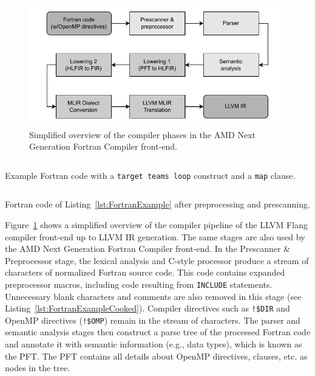 \documentclass[acmtog,natbib=false]{acmart}
\newcommand{\code}[1]{\texttt{#1}\xspace}
\begin{document}
\begin{figure}[t]
\centering
\includegraphics[width=\linewidth]{figures/flang_compiler_phases_overview.pdf}
\caption{Simplified overview of the compiler phases in the AMD Next Generation Fortran Compiler front-end.\label{fig:FlangCompilerPhases}}
\end{figure}

\begin{listing}[t]
\inputminted{Fortran}{code/tgt_loop.f90}
\caption{Example Fortran code with a \code{target teams loop} construct and a \code{map} clause.}
\label{lst:FortranExample}
\end{listing}

\begin{listing}[t]
\inputminted{text}{code/tgt_loop_cooked.f90}
\caption{Fortran code of Listing~\ref{lst:FortranExample} after preprocessing and prescanning.}
\label{lst:FortranExampleCooked}
\end{listing}

Figure~\ref{fig:FlangCompilerPhases} shows a simplified overview of the compiler pipeline of the LLVM Flang compiler front-end up to LLVM \ac{IR} generation.
The same stages are also used by the AMD Next Generation Fortran Compiler front-end.
In the Prescanner \& Preprocessor stage, the lexical analysis and C-style processor produce a stream of characters of normalized Fortran source code. 
This code contains expanded preprocessor macros, including code resulting from \code{INCLUDE} statements. Unnecessary blank characters and comments are also removed in this stage (see Listing~\ref{lst:FortranExampleCooked}).
Compiler directives such as \code{!\$DIR} and OpenMP directives (\code{!\$OMP}) remain in the stream of characters.
The parser and semantic analysis stages then construct a parse tree of the processed Fortran code and annotate it with semantic information (e.g., data types), which is known as the \ac{PFT}.
The \ac{PFT} contains all details about OpenMP directives, clauses, etc. as nodes in the tree.
\end{document}
